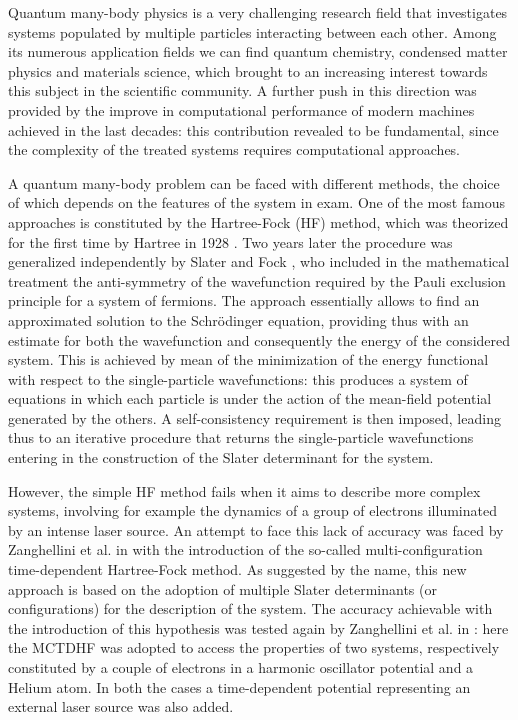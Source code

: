 Quantum many-body physics is a very challenging research field that investigates systems populated by multiple particles interacting between each other. Among its numerous application fields we can find quantum chemistry, condensed matter physics and materials science, which brought to an increasing interest towards this subject in the scientific community. A further push in this direction was provided by the improve in computational performance of modern machines achieved in the last decades: this contribution revealed to be fundamental, since the complexity of the treated systems requires computational approaches. 

A quantum many-body problem can be faced with different methods, the choice of which depends on the features of the system in exam. One of the most famous approaches is constituted by the Hartree-Fock (HF) method, which was theorized for the first time by Hartree in 1928 \cite{hartree_1928}. Two years later the procedure was generalized independently by Slater \cite{slater} and Fock \cite{fock}, who included in the mathematical treatment the anti-symmetry of the wavefunction required by the Pauli exclusion principle for a system of fermions. The approach essentially allows to find an approximated solution to the Schr\"odinger equation, providing thus with an estimate for both the wavefunction and consequently the energy of the considered system. This is achieved by mean of the minimization of the energy functional with respect to the single-particle wavefunctions: this produces a system of equations in which each particle is under the action of the mean-field potential generated by the others. A self-consistency requirement is then imposed, leading thus to an iterative procedure that returns the single-particle wavefunctions entering in the construction of the Slater determinant for the system.

However, the simple HF method fails when it aims to describe more complex systems, involving for example the dynamics of a group of electrons illuminated by an intense laser source. An attempt to face this lack of accuracy was faced by Zanghellini et al. in \cite{Zanghellini_2004} with the introduction of the so-called multi-configuration time-dependent Hartree-Fock method. As suggested by the name, this new approach is based on the adoption of multiple Slater determinants (or configurations) for the description of the system. The accuracy achievable with the introduction of this hypothesis was tested again by Zanghellini et al. in \cite{Zanghellini_2004}: here the MCTDHF was adopted to access the properties of two systems, respectively constituted by a couple of electrons in a harmonic oscillator potential and a Helium atom. In both the cases a time-dependent potential representing an external laser source was also added. \\

